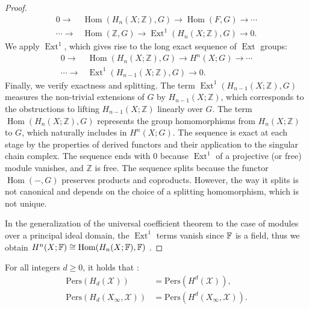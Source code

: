 \begin{proof}
\begin{align}
0 \rightarrow &\operatorname{Hom}(H_{n}(X; \mathbb{Z}), G) \rightarrow \operatorname{Hom}(F, G) \rightarrow \cdots \\
\cdots \rightarrow &\operatorname{Hom}(\mathbb{Z}, G) \rightarrow \operatorname{Ext}^{1}(H_{n}(X; \mathbb{Z}), G) \rightarrow 0.
\end{align}
We apply $\operatorname{Ext}^{1}$, which gives rise to the long exact sequence of $\operatorname{Ext}$ groups:
\begin{align}
0 \rightarrow &\operatorname{Hom}(H_{n}(X; \mathbb{Z}), G) \rightarrow H^{n}(X; G) \rightarrow \cdots \\
\cdots \rightarrow &\operatorname{Ext}^{1}(H_{n-1}(X; \mathbb{Z}), G) \rightarrow 0.
\end{align}
Finally, we verify exactness and splitting. The term $\operatorname{Ext}^{1}(H_{n-1}(X; \mathbb{Z}), G)$ measures the non-trivial extensions of $G$ by $H_{n-1}(X; \mathbb{Z})$, which corresponds to the obstructions to lifting $H_{n-1}(X; \mathbb{Z})$ linearly over $G$. The term $\operatorname{Hom}(H_{n}(X; \mathbb{Z}), G)$ represents the group homomorphisms from $H_{n}(X; \mathbb{Z})$ to $G$, which naturally includes in $H^{n}(X; G)$. The sequence is exact at each stage by the properties of derived functors and their application to the singular chain complex. The sequence ends with $0$ because $\operatorname{Ext}^{1}$ of a projective (or free) module vanishes, and $\mathbb{Z}$ is free. The sequence splits because the functor $\operatorname{Hom}(-, G)$ preserves products and coproducts. However, the way it splits is not canonical and depends on the choice of a splitting homomorphism, which is not unique.

In the generalization of the universal coefficient theorem to the case of modules over a principal ideal domain, the $\operatorname{Ext}^{1}$ terms vanish since ${\mathbb{F}}$ is a field, thus we obtain $H^{n}(X;{\mathbb{F}}) \cong \operatorname{Hom}(H_{n}(X;{\mathbb{F}}),{\mathbb{F}})$ \cite[p.198 \S 3.3.1]{hatcher2005algebraic}.
\end{proof}

\begin{theorem}
For all integers $d \geq 0$, it holds that \cite[\S 2.3]{de2011dualities}:
\begin{align}
\mathrm{Pers}(H_{d}(\mathcal{X})) &= \mathrm{Pers}(H^{d}(\mathcal{X})), \\
\mathrm{Pers}(H_{d}(X_{\infty}, \mathcal{X})) &= \mathrm{Pers}(H^{d}(X_{\infty}, \mathcal{X})).
\end{align}
\end{theorem}


